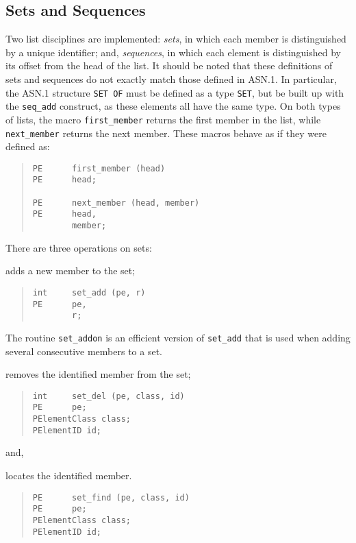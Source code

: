 \subsection	{Sets and Sequences}
Two list disciplines are implemented:
{\em sets}, in which each member is distinguished by a unique identifier;
and,
{\em sequences}, in which each element is distinguished by its offset from
the head of the list. It should be noted that these definitions of
sets and sequences do not exactly match those defined in ASN.1. In
particular, the ASN.1 structure \verb*"SET OF" must be defined as a
type \verb"SET", but be built up with the \verb"seq_add" construct,
as these elements all have the same type.
On both types of lists,
the macro \verb"first_member" returns the first member in the list,
while \verb"next_member" returns the next member.
These macros behave as if they were defined as:
\begin{quote}\small\begin{verbatim}
PE      first_member (head)
PE      head;

PE      next_member (head, member)
PE      head,
        member;
\end{verbatim}\end{quote}
There are three operations on sets:
\begin{describe}
\item[\verb"set\_add":] adds a new member to the set;
\begin{quote}\small\begin{verbatim}
int     set_add (pe, r)
PE      pe,
        r;
\end{verbatim}\end{quote}
The routine \verb"set_addon" is an efficient version of \verb"set_add" that
is used when adding several consecutive members to a set.

\item[\verb"set\_del":] removes the identified member from the
set;
\begin{quote}\small\begin{verbatim}
int     set_del (pe, class, id)
PE      pe;
PElementClass class;
PElementID id;
\end{verbatim}\end{quote}
and,

\item[\verb"set\_find":] locates the identified member.
\begin{quote}\small\begin{verbatim}
PE      set_find (pe, class, id)
PE      pe;
PElementClass class;
PElementID id;
\end{verbatim}\end{quote}
\end{describe}
